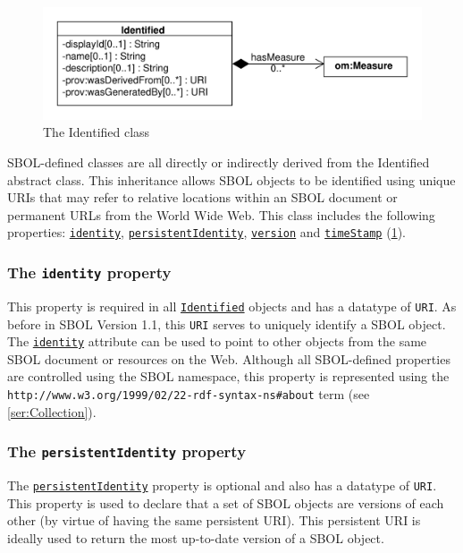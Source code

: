 \documentclass[draftspec]{sbmlpkgspec}
\newcommand{\sbolheading}[1]{\texttt{#1}}
\newcommand{\sbol}[1]{\texttt{\hyperref[sec:#1]{#1}}}
\newcommand{\external}[1]{\texttt{#1}}
\begin{document}
\begin{figure}[ht]
\begin{center}
\includegraphics[scale=0.6]{uml/identified}
\caption[]{The Identified class}
\label{uml:identified}
\end{center}
\end{figure}

SBOL-defined classes are all directly or indirectly derived from the Identified abstract class. This inheritance allows SBOL objects to be identified using unique URIs that may refer to relative locations within an SBOL document or permanent URLs from the World Wide Web. This class includes the following properties: \sbol{identity}, \sbol{persistentIdentity}, \sbol{version} and \sbol{timeStamp}
(\ref{uml:identified}).

\subsubsection*{The \sbolheading{identity} property}
\label{sec:identity}
This property is required in all \sbol{Identified} objects and has a datatype of \external{URI}. As before in SBOL Version 1.1, this \external{URI} serves to uniquely identify a SBOL object. The \sbol{identity} attribute can be used to point to other objects from the same SBOL document or resources on the Web. Although all SBOL-defined properties are controlled using the SBOL namespace, this property is represented using the \external{http://www.w3.org/1999/02/22-rdf-syntax-ns\#about} term (see \ref{ser:Collection}).

\subsubsection*{The \sbolheading{persistentIdentity} property}
\label{sec:persistentIdentity}
The \sbol{persistentIdentity} property is optional and also has a datatype of \external{URI}. This property is used to declare that a set of SBOL objects are versions of each other (by virtue of having the same persistent URI). This persistent URI is ideally used to return the most up-to-date version of a SBOL object.
\end{document}

